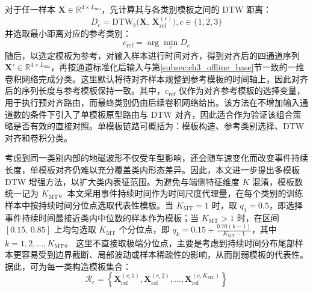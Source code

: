 \documentclass{xdupgthesis}
\begin{document}
对于任一样本 $\mathbf{X}\in\mathbb{R}^{4\times L_{\mathrm{uni}}}$，先计算其与各类别模板之间的 DTW 距离：
\begin{equation}
    D_c=\mathrm{DTW}_{b}\big(\mathbf{X},\,\mathbf{X}_{\mathrm{ref}}^{(c)}\big), c\in\{1,2,3\}
\end{equation}
并选取最小距离对应的参考类别：
\begin{equation}
    c_{\mathrm{ref}}=\arg\min_c D_c
\end{equation}
随后，以选定模板为参考，对输入样本进行时间对齐，得到对齐后的四通道序列 $\mathbf{X}'\in\mathbb{R}^{4\times L_{\mathrm{uni}}}$，再按通道标准化后输入与第\ref{subsec:ch3_offline_base}节一致的一维卷积网络完成分类。这里默认将待对齐样本规整到参考模板的时间轴上，因此对齐后的序列长度与参考模板保持一致。其中，$c_{\mathrm{ref}}$ 仅作为对齐参考模板的选择变量，用于执行预对齐路由，而最终类别仍由后续卷积网络给出。该方法在不增加输入通道数的条件下引入了单模板原型路由与 DTW 对齐，因此适合作为验证该组合策略是否有效的直接对照。单模板链路可概括为：模板构造、参考类别选择、DTW 对齐和卷积分类。

考虑到同一类别内部的地磁波形不仅受车型影响，还会随车速变化而改变事件持续长度，单模板对齐仍难以充分覆盖类内形态差异。因此，本文进一步提出多模板 DTW 增强方法，以扩大类内表征范围。为避免与端侧特征维度 $K$ 混淆，模板数统一记为 $K_{\mathrm{MT}}$。本文采用事件持续时间作为时间尺度代理量，在每个类别的训练样本中按持续时间分位点选取代表性模板。当 $K_{\mathrm{MT}}=1$ 时，取 $q_1=0.5$，即选择事件持续时间最接近类内中位数的样本作为模板；当 $K_{\mathrm{MT}}>1$ 时，在区间 $[0.15,\,0.85]$ 上均匀选取 $K_{\mathrm{MT}}$ 个分位点，即 $q_k=0.15+\frac{0.70(k-1)}{K_{\mathrm{MT}}-1}$，其中 $k=1,2,\ldots,K_{\mathrm{MT}}$。
这里不直接取极端分位点，主要是考虑到持续时间分布尾部样本更容易受到边界截断、局部波动或样本稀疏性的影响，从而削弱模板的代表性。
据此，可为每一类构造模板集合：
\begin{equation}
    \mathcal{R}_c=
    \left\{
    \mathbf{X}_{\mathrm{ref}}^{(c,1)},
    \mathbf{X}_{\mathrm{ref}}^{(c,2)},
    \ldots,
    \mathbf{X}_{\mathrm{ref}}^{(c,K_{\mathrm{MT}})}
    \right\}
\end{equation}
\end{document}
